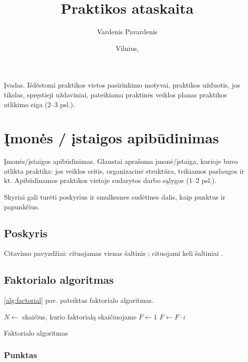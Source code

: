 \documentclass{VUMIFPSBakPrakAt}
\title{Praktikos ataskaita}
\author{Vardenis Pavardenis}
\date{Vilnius, \the\year}
\begin{document}
\maketitle

\tableofcontents

Įvadas. Išdėstomi praktikos vietos pasirinkimo motyvai, praktikos užduotis, jos tikslas, spręstieji
uždaviniai, pateikiama praktinės veiklos planas praktikos atlikimo eiga (2--3 psl.).

\section{Įmonės / įstaigos apibūdinimas}
Įmonės/įstaigos apibūdinimas. Glaustai aprašoma įmonė/įstaiga, kurioje buvo atlikta praktika: jos
veiklos sritis, organizacinė struktūra, teikiamos paslaugos ir kt. Apibūdinamos praktikos vietoje
sudarytos darbo sąlygos (1--2 psl.).

Skyriai gali turėti poskyrius ir smulkesnes sudėtines dalis, kaip punktus ir
papunkčius.

\subsection{Poskyris}
Citavimo pavyzdžiai: cituojamas vienas šaltinis \cite{PvzStraipsnLt}; cituojami
keli šaltiniai \cite{PvzStraipsnEn, PvzKonfLt, PvzKonfEn, PvzKnygLt, PvzKnygEn,
PvzElPubLt, PvzElPubEn, PvzBakLt, PvzMagistrLt, PvzPhdEn}.

\subsection{Faktorialo algoritmas}

\ref{alg:factorial} pav. pateiktas faktorialo algoritmas.

\begin{algorithm}
\begin{algorithmic}[1] %
\State $N\gets$ skaičius, kurio faktorialą skaičiuojame
\State $F\gets 1$
    \State $F\gets F \cdot i$
\EndFor
\end{algorithmic}
\caption{Faktorialo algoritmas}
\label{alg:factorial}
\end{algorithm}

\subsubsection{Punktas}
\end{document}
